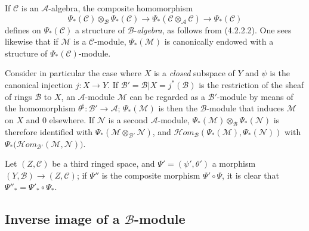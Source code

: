 \begin{env}[4.2.4]
\label{0.4.2.4}
If $\mathcal{C}$ is an $\mathcal{A}$-algebra, the composite homomorphism
\[
  \Psi_*(\mathcal{C})\otimes_{\mathcal{B}}\Psi_*(\mathcal{C})
  \longrightarrow
  \Psi_*(\mathcal{C}\otimes_{\mathcal{A}}\mathcal{C})
  \longrightarrow
  \Psi_*(\mathcal{C})
\]
defines on $\Psi_*(\mathcal{C})$ a structure of $\mathcal{B}$-\emph{algebra},
as follows from (4.2.2.2). One sees likewise that if $\mathcal{M}$ is a
$\mathcal{C}$-module, $\Psi_*(\mathcal{M})$ is canonically endowed with a
structure of $\Psi_*(\mathcal{C})$-module.
\end{env}

\begin{env}[4.2.5]
\label{0.4.2.5}
Consider in particular the case where $X$ is a \emph{closed} subspace of
$Y$ and $\psi$ is the canonical injection $j:X\to Y$. If
$\mathcal{B}'=\mathcal{B}|X=j^*(\mathcal{B})$ is the restriction of the sheaf
of rings $\mathcal{B}$ to $X$, an $\mathcal{A}$-module $\mathcal{M}$ can
be regarded as a $\mathcal{B}'$-module by means of the homomorphism
$\theta^\sharp:\mathcal{B}'\to\mathcal{A}$; $\Psi_*(\mathcal{M})$ is then
the $\mathcal{B}$-module that induces $\mathcal{M}$ on $X$ and $0$ elsewhere. If
$\mathcal{N}$ is a second $\mathcal{A}$-module,
$\Psi_*(\mathcal{M})\otimes_{\mathcal{B}}\Psi_*(\mathcal{N})$ is therefore identified
with $\Psi_*(\mathcal{M}\otimes_{\mathcal{B}'}\mathcal{N})$, and
$\mathcal{H}\!om_{\mathcal{B}}(\Psi_*(\mathcal{M}),\Psi_*(\mathcal{N}))$
with
$\Psi_*\bigl(\mathcal{H}\!om_{\mathcal{B}'}(\mathcal{M},\mathcal{N})\bigr)$.
\end{env}

\begin{env}[4.2.6]
\label{0.4.2.6}
Let $(Z,\mathcal{C})$ be a third ringed space, and
$\Psi'=(\psi',\theta')$ a morphism
$(Y,\mathcal{B})\to(Z,\mathcal{C})$; if $\Psi''$ is the composite morphism
$\Psi'\circ\Psi$, it is clear that
$\Psi''_*=\Psi'_*\circ\Psi_*$.
\end{env}

\subsection{Inverse image of a $\mathcal{B}$-module}
\label{subsection:0.4.3}

